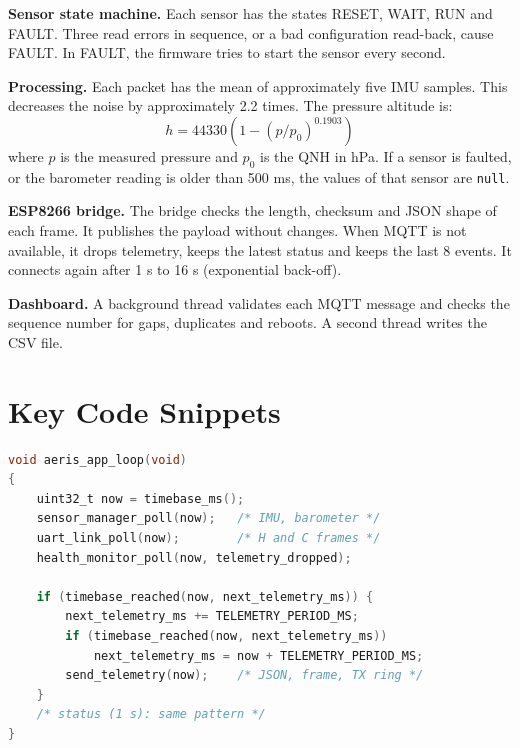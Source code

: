 \documentclass[12pt,a4paper]{report}
\begin{document}
\textbf{Sensor state machine.} Each sensor has the states RESET, WAIT, RUN and FAULT. Three read errors in sequence, or a bad configuration read-back, cause FAULT. In FAULT, the firmware tries to start the sensor every second.

\textbf{Processing.} Each packet has the mean of approximately five IMU samples. This decreases the noise by approximately 2.2 times. The pressure altitude is:
\begin{equation}
h = 44330 \left(1 - \left(p / p_0\right)^{0.1903}\right)
\end{equation}
where $p$ is the measured pressure and $p_0$ is the QNH in hPa. If a sensor is faulted, or the barometer reading is older than 500 ms, the values of that sensor are \texttt{null}.

\textbf{ESP8266 bridge.} The bridge checks the length, checksum and JSON shape of each frame. It publishes the payload without changes. When MQTT is not available, it drops telemetry, keeps the latest status and keeps the last 8 events. It connects again after 1 s to 16 s (exponential back-off).

\textbf{Dashboard.} A background thread validates each MQTT message and checks the sequence number for gaps, duplicates and reboots. A second thread writes the CSV file.

\section{Key Code Snippets}
\begin{lstlisting}[language=C,caption={STM32 main loop (aeris\_app.c)}]
void aeris_app_loop(void)
{
    uint32_t now = timebase_ms();
    sensor_manager_poll(now);   /* IMU, barometer */
    uart_link_poll(now);        /* H and C frames */
    health_monitor_poll(now, telemetry_dropped);

    if (timebase_reached(now, next_telemetry_ms)) {
        next_telemetry_ms += TELEMETRY_PERIOD_MS;
        if (timebase_reached(now, next_telemetry_ms))
            next_telemetry_ms = now + TELEMETRY_PERIOD_MS;
        send_telemetry(now);    /* JSON, frame, TX ring */
    }
    /* status (1 s): same pattern */
}
\end{lstlisting}
\end{document}
